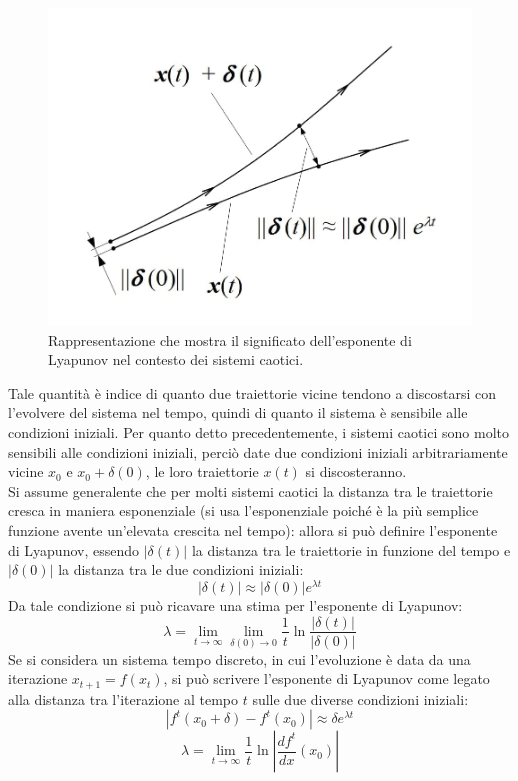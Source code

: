 \documentclass[12pt]{article}
\begin{document}
\begin{figure}[H]
	\centering
	\includegraphics[scale=0.5]{Lyap_Exp}
	\caption{Rappresentazione che mostra il significato dell'esponente di Lyapunov nel contesto dei sistemi caotici.}
\end{figure}

Tale quantità è indice di quanto due traiettorie vicine tendono a discostarsi con l'evolvere del sistema nel tempo, quindi di quanto il sistema è sensibile alle  condizioni  iniziali.
Per quanto detto precedentemente, i sistemi caotici sono molto sensibili alle condizioni iniziali, perciò date due condizioni iniziali arbitrariamente vicine $x_0$ e $x_0 + \delta(0)$, le loro traiettorie $x(t)$ si discosteranno.\\
Si assume generalente che per molti sistemi caotici la distanza tra le traiettorie cresca in maniera esponenziale (si usa l'esponenziale poiché è la più semplice funzione avente un'elevata crescita nel tempo): allora si può definire l'esponente di Lyapunov, essendo $|\delta(t)|$ la distanza tra le traiettorie in funzione del tempo e $|\delta(0)|$ la distanza tra le due condizioni iniziali:
$$
|\delta(t)| \approx |\delta(0)|e^{\lambda t}
$$
Da tale condizione si può ricavare una stima per l'esponente di Lyapunov:
\begin{equation}
	\lambda =\lim_{t\to\infty} \lim_{\delta(0)\to 0} \frac{1}{t}\ln{\frac{|\delta(t)|}{|\delta(0)|}}
\end{equation}
Se si considera un sistema tempo  discreto, in cui l'evoluzione è data da una iterazione $x_{t+1} = f(x_t)$, si può scrivere l'esponente di Lyapunov come legato alla distanza tra l'iterazione al tempo $t$ sulle due diverse condizioni iniziali:
$$
|f^t(x_0 + \delta)-f^t(x_0)| \approx \delta e^{\lambda t}
$$
\begin{equation}
	\lambda =\lim_{t\to\infty} \frac{1}{t}\ln{\left|\frac{df^t}{dx}(x_0)\right|}
\end{equation}
\end{document}
